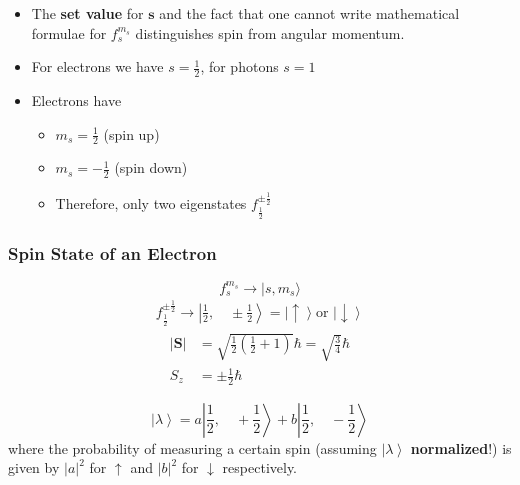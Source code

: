 \begin{itemize}
    \item The \textbf{set value} for $\mathbf{s}$ and the fact that one cannot write mathematical formulae for $f_{s}^{m_s}$ distinguishes spin from angular momentum.
    \item For electrons we have $s=\frac{1}{2}$, for photons $s=1$
    \item Electrons have
          \begin{itemize}
              \item $m_s=\frac{1}{2}$ (spin up)
              \item $m_s=-\frac{1}{2}$ (spin down)
              \item Therefore, only two eigenstates $f_{\frac{1}{2}}^{\pm \frac{1}{2}}$
          \end{itemize}
\end{itemize}

\subsubsection{Spin State of an Electron}
\noindent\begin{equation*}
    f_{s}^{m_{s}}\rightarrow|s,m_{s}\rangle
\end{equation*}
\noindent\begin{align*}
    f_{\frac{1}{2}}^{\pm\frac{1}{2}} \rightarrow\left|\frac{1}{2},\quad \pm\frac{1}{2}\right>= \left|\uparrow\right> \text{or } \left|\downarrow\right>
\end{align*}
\begin{align*}
    |\mathbf{S}| & =\sqrt{\frac{1}{2}\left(\frac{1}{2}+1\right)}\hbar=\sqrt{\frac{3}{4}}\hbar \\
    S_z          & =\pm \frac{1}{2}\hbar
\end{align*}

\begin{equation*}
    \left|\lambda\right>=a\left|\frac{1}{2},\quad +\frac{1}{2}\right>+b\left|\frac{1}{2},\quad -\frac{1}{2}\right>
\end{equation*}
where the probability of measuring a certain spin (assuming $\left|\lambda\right>$ \textbf{normalized}!) is given by $|a|^2$ for $\uparrow$ and $|b|^2$ for $\downarrow$ respectively.

\newpar{}

